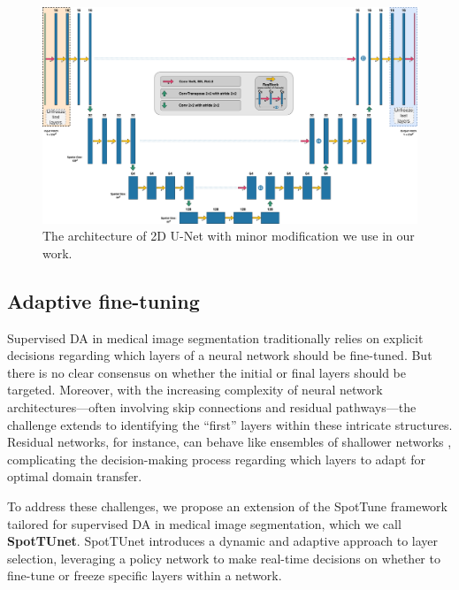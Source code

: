 \begin{landscape}
\begin{figure}[p]
	\centering
	\includegraphics[width=\linewidth]{Dissertation/Figures/2_mri/unet2d_da.pdf}
	\caption{The architecture of 2D U-Net with minor modification we use in our work.} %
	\label{fig:mri:unet2d_da}
\end{figure}
\end{landscape}


\subsection{Adaptive fine-tuning}

Supervised DA in medical image segmentation traditionally relies on explicit decisions regarding which layers of a neural network should be fine-tuned. But there is no clear consensus on whether the initial or final layers should be targeted. Moreover, with the increasing complexity of neural network architectures---often involving skip connections and residual pathways---the challenge extends to identifying the ``first'' layers within these intricate structures. Residual networks, for instance, can behave like ensembles of shallower networks \cite{veit2016residual}, complicating the decision-making process regarding which layers to adapt for optimal domain transfer.

To address these challenges, we propose an extension of the SpotTune framework \cite{guo2019spottune} tailored for supervised DA in medical image segmentation, which we call \textbf{SpotTUnet}. SpotTUnet introduces a dynamic and adaptive approach to layer selection, leveraging a policy network to make real-time decisions on whether to fine-tune or freeze specific layers within a network.

